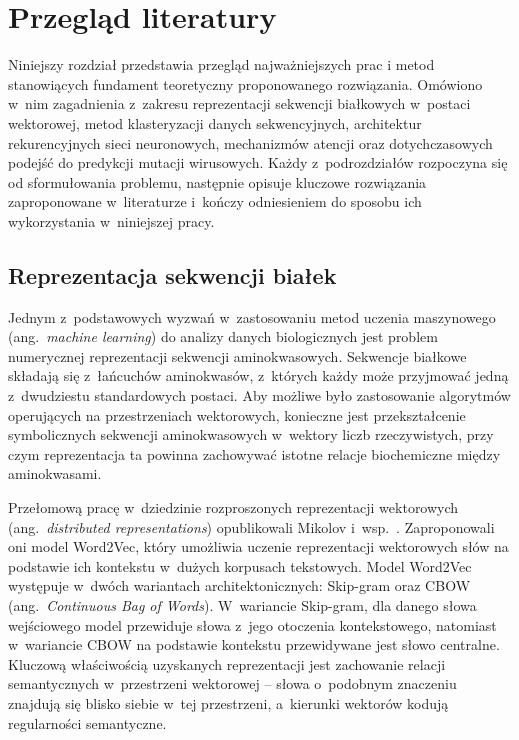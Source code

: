 \newpage
\section{Przegląd literatury}
\label{sec:przeglad-literatury}

Niniejszy rozdział przedstawia przegląd najważniejszych prac i metod stanowiących fundament teoretyczny proponowanego rozwiązania. Omówiono w~nim zagadnienia z~zakresu reprezentacji sekwencji białkowych w~postaci wektorowej, metod klasteryzacji danych sekwencyjnych, architektur rekurencyjnych sieci neuronowych, mechanizmów atencji oraz dotychczasowych podejść do predykcji mutacji wirusowych. Każdy z~podrozdziałów rozpoczyna się od sformułowania problemu, następnie opisuje kluczowe rozwiązania zaproponowane w~literaturze i~kończy odniesieniem do sposobu ich wykorzystania w~niniejszej pracy.

\subsection{Reprezentacja sekwencji białek}
\label{sec:reprezentacja-sekwencji}

Jednym z~podstawowych wyzwań w~zastosowaniu metod uczenia maszynowego (ang.~\textit{machine learning}) do analizy danych biologicznych jest problem numerycznej reprezentacji sekwencji aminokwasowych. Sekwencje białkowe składają się z~łańcuchów aminokwasów, z~których każdy może przyjmować jedną z~dwudziestu standardowych postaci. Aby możliwe było zastosowanie algorytmów operujących na przestrzeniach wektorowych, konieczne jest przekształcenie symbolicznych sekwencji aminokwasowych w~wektory liczb rzeczywistych, przy czym reprezentacja ta powinna zachowywać istotne relacje biochemiczne między aminokwasami.

Przełomową pracę w~dziedzinie rozproszonych reprezentacji wektorowych (ang.~\textit{distributed representations}) opublikowali Mikolov i~wsp.~\cite{mikolov2013word2vec}. Zaproponowali oni model Word2Vec, który umożliwia uczenie reprezentacji wektorowych słów na podstawie ich kontekstu w~dużych korpusach tekstowych. Model Word2Vec występuje w~dwóch wariantach architektonicznych: Skip-gram oraz CBOW (ang.~\textit{Continuous Bag of Words}). W~wariancie Skip-gram, dla danego słowa wejściowego model przewiduje słowa z~jego otoczenia kontekstowego, natomiast w~wariancie CBOW na podstawie kontekstu przewidywane jest słowo centralne. Kluczową właściwością uzyskanych reprezentacji jest zachowanie relacji semantycznych w~przestrzeni wektorowej -- słowa o~podobnym znaczeniu znajdują się blisko siebie w~tej przestrzeni, a~kierunki wektorów kodują regularności semantyczne.

